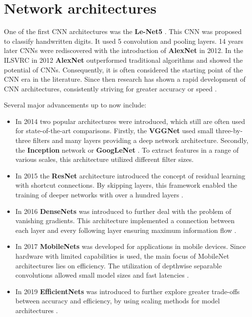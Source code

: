 \section{Network architectures}
\label{sec:networkArchitectures}

One of the first CNN architectures was the \textbf{Le-Net5} \cite{LeNet5}.
This CNN was proposed to classify handwritten digits.
It used 5 convolution and pooling layers.
14 years later CNNs were rediscovered with the introduction of \textbf{AlexNet} \cite{AlexNet2012} in 2012.
In the \ac{ILSVRC} \cite{ILSVRC15} in 2012 \textbf{AlexNet} outperformed traditional algorithms and showed the potential of CNNs.
Consequently, it is often considered the starting point of the CNN era in the literature.
Since then research has shown a rapid development of CNN architectures, consistently striving for greater accuracy or speed \cite{networkArchitectureSurvey}.

\vspace{1cm} %

\noindent Several major advancements up to now include:

\begin{itemize}
    \item In 2014 two popular architectures were introduced, which still are often used for state-of-the-art comparisons. Firstly, the \textbf{\ac{VGGNet}} \cite{VGGNet2015} used small three-by-three filters and many layers providing a deep network architecture. Secondly, the \textbf{Inception} network or \textbf{GoogLeNet} \cite{InceptionNet}. To extract features in a range of various scales, this architecture utilized different filter sizes.
    \item In 2015 the \textbf{ResNet} architecture \cite{ResNet} introduced the concept of residual learning with shortcut connections. By skipping layers, this framework enabled the training of deeper networks with over a hundred layers \cite{networkArchitectureSurvey}.
    \item In 2016 \textbf{DenseNets} \cite{DenseNets} was introduced to further deal with the problem of vanishing gradients. This architecture implemented a connection between each layer and every following layer ensuring maximum information flow \cite{networkArchitectureSurvey}.
    \item In 2017 \textbf{MobileNets} \cite{MobileNetV1} \cite{MobileNetV2} \cite{MobileNetV3} was developed for applications in mobile devices. Since hardware with limited capabilities is used, the main focus of MobileNet architectures lies on efficiency. The utilization of depthwise separable convolutions allowed small model sizes and fast latencies \cite{networkArchitectureSurvey}.
    \item In 2019 \textbf{EfficientNets} \cite{EfficientNet} was introduced to further explore greater trade-offs between accuracy and efficiency, by using scaling methods for model architectures \cite{networkArchitectureSurvey}. 
\end{itemize}

